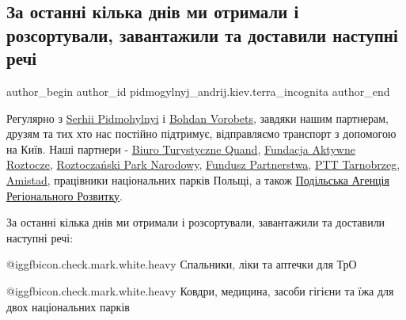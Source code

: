  
 
 
 
 
 
\subsection{За останні кілька днів ми отримали і розсортували, завантажили та доставили наступні речі}
\label{sec:28_03_2022.fb.pidmogylnyj_andrij.kiev.terra_incognita.1.rechi}
 
\ifcmt
 author_begin
   author_id pidmogylnyj_andrij.kiev.terra_incognita
 author_end
\fi

Регулярно з \href{https://www.facebook.com/sergiy.pidmogylnyy}{Serhii Pidmohylnyi} і 
\href{https://www.facebook.com/VorobetsBohdan}{Bohdan Vorobets}, завдяки нашим партнерам,
друзям та тих хто нас постійно підтримує, відправляємо транспорт з допомогою на
Київ. Наші партнери - \href{https://www.facebook.com/bt.quand}{Biuro Turystyczne Quand}, 
\href{https://www.facebook.com/Fundacja-Aktywne-Roztocze-105436672088049}{Fundacja Aktywne Roztocze},
\href{https://www.facebook.com/RoztoczanskiPN}{Roztoczański Park Narodowy}, 
\href{https://www.facebook.com/Fundusz.Partnerstwa}{Fundusz Partnerstwa}, 
\href{https://www.facebook.com/ptt.tarnobrzeg}{PTT Tarnobrzeg}, 
\href{https://www.facebook.com/AmistadGroup}{Amistad},
працівники національних парків Польщі, а також \href{https://www.facebook.com/pard.vn}{Подільська Агенція Регіонального
Розвитку}.


За останні кілька днів ми отримали і розсортували, завантажили та доставили наступні речі:

@igg{fbicon.check.mark.white.heavy}  Спальники, ліки та аптечки для ТрО

@igg{fbicon.check.mark.white.heavy}  Ковдри, медицина, засоби гігієни та їжа
для двох національних парків

